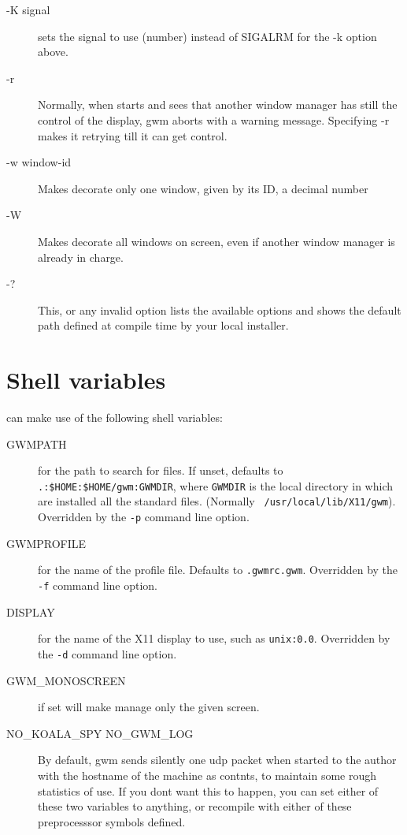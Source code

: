 \begin{description}
\item[-K signal]
sets the signal to use (number) instead of SIGALRM for the -k option above.

\item[-r]
Normally, when {\GWM} starts and sees that another window manager has still the
control of the display, gwm aborts with a warning message. Specifying -r makes
it retrying till it can get control.

\item[-w window-id]
Makes {\GWM} decorate only one window, given by its ID, a decimal number

\item[-W]
Makes {\GWM} decorate all windows on screen, even if another window manager 
is already in charge.

\item[-?] This, or any invalid option lists the available options and shows the
default path defined at compile time by your local installer.

\end{description}

\section{Shell variables}

{\GWM} can make use of the following shell variables:

\begin{description}

\item[GWMPATH] \sloppy for the path to search for files. If unset, defaults to
\verb".:$HOME:$HOME/gwm:GWMDIR", where {\tt GWMDIR} is the local directory
in which are installed all the standard {\GWM} files. (Normally {\tt
/usr/local/lib/X11/gwm}). Overridden by the \verb"-p" command line option.

\item[GWMPROFILE] for the name of the profile file. Defaults to
\verb".gwmrc.gwm". Overridden by the \verb"-f" command line option.

\item[DISPLAY] for the name of the X11 display to use, such as
\verb"unix:0.0". Overridden by the \verb"-d" command line option.

\item[GWM\_MONOSCREEN] if set will make {\GWM} manage only the given screen.

\item[NO\_KOALA\_SPY   NO\_GWM\_LOG] By default, gwm sends silently one udp
 packet when started to the author with the hostname of the machine as
contnts, to maintain some rough statistics of use. If you dont want this to
happen, you can set either of these two variables to anything, or recompile
with either of these preprocesssor symbols defined.


\end{description}

